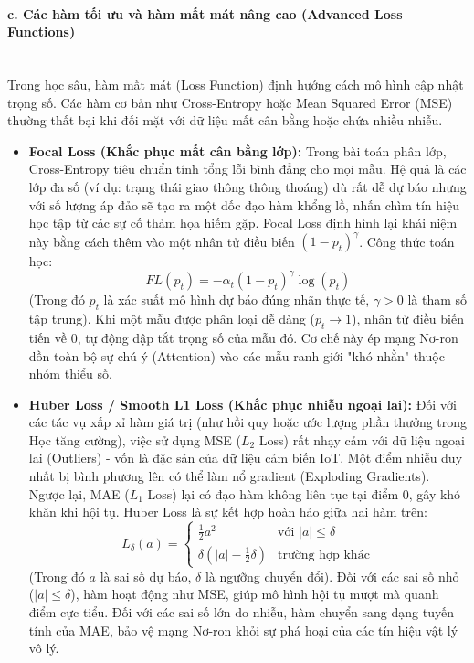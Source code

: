 \paragraph{c. Các hàm tối ưu và hàm mất mát nâng cao (Advanced Loss Functions)} \mbox{} \\
Trong học sâu, hàm mất mát (Loss Function) định hướng cách mô hình cập nhật trọng số. Các hàm cơ bản như Cross-Entropy hoặc Mean Squared Error (MSE) thường thất bại khi đối mặt với dữ liệu mất cân bằng hoặc chứa nhiều nhiễu.
\begin{itemize}
    \item \textbf{Focal Loss (Khắc phục mất cân bằng lớp):} Trong bài toán phân lớp, Cross-Entropy tiêu chuẩn tính tổng lỗi bình đẳng cho mọi mẫu. Hệ quả là các lớp đa số (ví dụ: trạng thái giao thông thông thoáng) dù rất dễ dự báo nhưng với số lượng áp đảo sẽ tạo ra một dốc đạo hàm khổng lồ, nhấn chìm tín hiệu học tập từ các sự cố thảm họa hiếm gặp.
    Focal Loss định hình lại khái niệm này bằng cách thêm vào một nhân tử điều biến $(1 - p_t)^\gamma$. Công thức toán học:
    $$FL(p_t) = -\alpha_t (1 - p_t)^\gamma \log(p_t)$$
    (Trong đó $p_t$ là xác suất mô hình dự báo đúng nhãn thực tế, $\gamma > 0$ là tham số tập trung).
    Khi một mẫu được phân loại dễ dàng ($p_t \rightarrow 1$), nhân tử điều biến tiến về 0, tự động dập tắt trọng số của mẫu đó. Cơ chế này ép mạng Nơ-ron dồn toàn bộ sự chú ý (Attention) vào các mẫu ranh giới "khó nhằn" thuộc nhóm thiểu số.
    \item \textbf{Huber Loss / Smooth L1 Loss (Khắc phục nhiễu ngoại lai):} Đối với các tác vụ xấp xỉ hàm giá trị (như hồi quy hoặc ước lượng phần thưởng trong Học tăng cường), việc sử dụng MSE ($L_2$ Loss) rất nhạy cảm với dữ liệu ngoại lai (Outliers) - vốn là đặc sản của dữ liệu cảm biến IoT. Một điểm nhiễu duy nhất bị bình phương lên có thể làm nổ gradient (Exploding Gradients). Ngược lại, MAE ($L_1$ Loss) lại có đạo hàm không liên tục tại điểm 0, gây khó khăn khi hội tụ.
    Huber Loss là sự kết hợp hoàn hảo giữa hai hàm trên:
    $$L_\delta(a) = \begin{cases} \frac{1}{2} a^2 & \text{với } |a| \le \delta \\ \delta (|a| - \frac{1}{2}\delta) & \text{trường hợp khác} \end{cases}$$
    (Trong đó $a$ là sai số dự báo, $\delta$ là ngưỡng chuyển đổi).
    Đối với các sai số nhỏ ($|a| \le \delta$), hàm hoạt động như MSE, giúp mô hình hội tụ mượt mà quanh điểm cực tiểu. Đối với các sai số lớn do nhiễu, hàm chuyển sang dạng tuyến tính của MAE, bảo vệ mạng Nơ-ron khỏi sự phá hoại của các tín hiệu vật lý vô lý.
\end{itemize}

